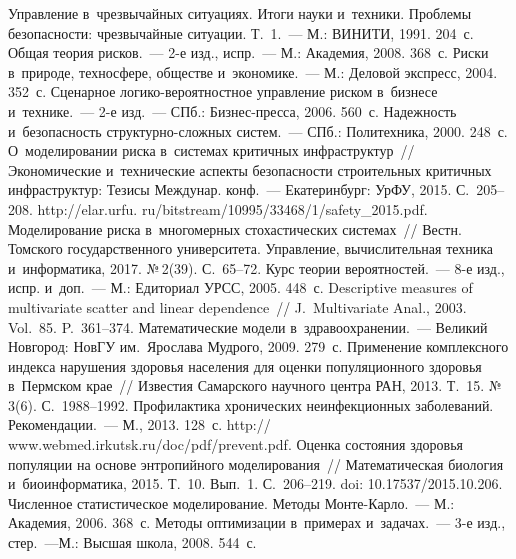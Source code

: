 \begin{multicols}{2}
{{\begin{thebibliography}{99}
 Управ\-ле\-ние в~чрез\-вы\-чай\-ных ситуациях. Итоги науки 
и~техники. Проб\-ле\-мы без\-опас\-ности: чрез\-вы\-чай\-ные ситуации. Т.~1.~--- М.: 
ВИНИТИ, 1991. 204~с.
 Общая теория рисков.~--- 
2-е изд., испр.~--- М.: Академия, 2008. 368~с.
 Риски в~природе, техносфере, 
обществе и~экономике.~--- М.: Деловой экспресс, 2004. 352~с.
 Сценарное ло\-ги\-ко-ве\-ро\-ят\-ност\-ное управ\-ле\-ние 
рис\-ком в~бизнесе и~технике.~--- 2-е изд.~--- СПб.: Биз\-нес-прес\-са, 2006. 560~с.
 На\-деж\-ность и~без\-опас\-ность струк\-тур\-но-слож\-ных  
сис\-тем.~--- СПб.: Политехника, 2000. 248~с.
 О~моделировании рис\-ка в~сис\-те\-мах критичных 
инфра\-струк\-тур~// Экономические и~технические аспекты без\-опас\-ности 
строительных критичных инфраструктур: Тезисы Междунар. конф.~--- 
Екатеринбург: УрФУ, 2015. С.~205--208. {\sf 
http://elar.urfu. ru/bitstream/10995/33468/1/safety\_2015.pdf.}
 Моделирование рис\-ка в~многомерных 
сто\-ха\-сти\-че\-ских сис\-те\-мах~// Вестн. Томского государственного университета. 
Управ\-ле\-ние, вы\-чис\-ли\-тель\-ная техника и~информатика, 2017. №\,2(39).  
С.~65--72.
 Курс тео\-рии вероятностей.~--- 8-е изд., испр. и~доп.~--- М.: 
Едиториал УРСС, 2005. 448~с.
 Descriptive measures of multivariate scatter and linear 
dependence~// J.~Multivariate Anal., 2003. Vol.~85. P.~361--374.
 Математические модели 
в~здравоохранении.~--- Великий Новгород: НовГУ им.\ Ярослава Мудрого, 
2009. 279~с.
 Применение 
комплексного ин\-дек\-са нарушения здо\-ровья населения для оцен\-ки 
популяционного здо\-ровья в~Пермском крае~// Из\-вес\-тия Самарского научного 
цент\-ра РАН, 2013. Т.~15. №\,3(6). С.~1988--1992.
Профилактика хронических неинфекционных заболеваний. Рекомендации.~--- 
М., 2013. 128~с. {\sf http:// www.webmed.irkutsk.ru/doc/pdf/prevent.pdf}.
 Оцен\-ка 
со\-сто\-яния здо\-ровья популяции на основе энтропийного моделирования~// 
Математическая био\-ло\-гия и~био\-ин\-фор\-ма\-ти\-ка, 2015. Т.~10. Вып.~1.  
С.~206--219. doi: 10.17537/2015.10.206.
 Чис\-лен\-ное ста\-ти\-сти\-че\-ское 
моделирование. Методы Мон\-те-Кар\-ло.~--- М.: Академия, 2006. 368~с.
 Методы оптимизации в~примерах 
и~задачах.~--- 3-е изд., стер.~---М.: Выс\-шая школа, 2008. 544~с.

 \end{thebibliography}

 }
 }

\end{multicols}

